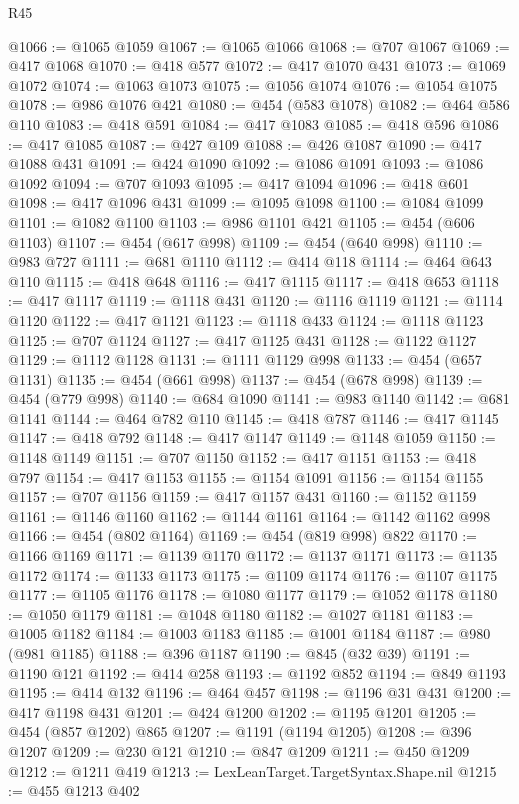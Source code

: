 \begin{lexlean}{R45}
\begin{coremodule}
{{{{{{{{{{{{{{{{{{{{{{{{{{{{{{{{{{{{{{{{{{{{{{{{{{{{{{{{{{{{{{{{{{{{{{{{{{{{{{{{{{{{{{{{{{{@1066 := @1065 @1059
@1067 := @1065 @1066
@1068 := @707 @1067
@1069 := @417 @1068
@1070 := @418 @577
@1072 := @417 @1070 @431
@1073 := @1069 @1072
@1074 := @1063 @1073
@1075 := @1056 @1074
@1076 := @1054 @1075
@1078 := @986 @1076 @421
@1080 := @454 (@583 @1078)
@1082 := @464 @586 @110
@1083 := @418 @591
@1084 := @417 @1083
@1085 := @418 @596
@1086 := @417 @1085
@1087 := @427 @109
@1088 := @426 @1087
@1090 := @417 @1088 @431
@1091 := @424 @1090
@1092 := @1086 @1091
@1093 := @1086 @1092
@1094 := @707 @1093
@1095 := @417 @1094
@1096 := @418 @601
@1098 := @417 @1096 @431
@1099 := @1095 @1098
@1100 := @1084 @1099
@1101 := @1082 @1100
@1103 := @986 @1101 @421
@1105 := @454 (@606 @1103)
@1107 := @454 (@617 @998)
@1109 := @454 (@640 @998)
@1110 := @983 @727
@1111 := @681 @1110
@1112 := @414 @118
@1114 := @464 @643 @110
@1115 := @418 @648
@1116 := @417 @1115
@1117 := @418 @653
@1118 := @417 @1117
@1119 := @1118 @431
@1120 := @1116 @1119
@1121 := @1114 @1120
@1122 := @417 @1121
@1123 := @1118 @433
@1124 := @1118 @1123
@1125 := @707 @1124
@1127 := @417 @1125 @431
@1128 := @1122 @1127
@1129 := @1112 @1128
@1131 := @1111 @1129 @998
@1133 := @454 (@657 @1131)
@1135 := @454 (@661 @998)
@1137 := @454 (@678 @998)
@1139 := @454 (@779 @998)
@1140 := @684 @1090
@1141 := @983 @1140
@1142 := @681 @1141
@1144 := @464 @782 @110
@1145 := @418 @787
@1146 := @417 @1145
@1147 := @418 @792
@1148 := @417 @1147
@1149 := @1148 @1059
@1150 := @1148 @1149
@1151 := @707 @1150
@1152 := @417 @1151
@1153 := @418 @797
@1154 := @417 @1153
@1155 := @1154 @1091
@1156 := @1154 @1155
@1157 := @707 @1156
@1159 := @417 @1157 @431
@1160 := @1152 @1159
@1161 := @1146 @1160
@1162 := @1144 @1161
@1164 := @1142 @1162 @998
@1166 := @454 (@802 @1164)
@1169 := @454 (@819 @998) @822
@1170 := @1166 @1169
@1171 := @1139 @1170
@1172 := @1137 @1171
@1173 := @1135 @1172
@1174 := @1133 @1173
@1175 := @1109 @1174
@1176 := @1107 @1175
@1177 := @1105 @1176
@1178 := @1080 @1177
@1179 := @1052 @1178
@1180 := @1050 @1179
@1181 := @1048 @1180
@1182 := @1027 @1181
@1183 := @1005 @1182
@1184 := @1003 @1183
@1185 := @1001 @1184
@1187 := @980 (@981 @1185)
@1188 := @396 @1187
@1190 := @845 (@32 @39)
@1191 := @1190 @121
@1192 := @414 @258
@1193 := @1192 @852
@1194 := @849 @1193
@1195 := @414 @132
@1196 := @464 @457
@1198 := @1196 @31 @431
@1200 := @417 @1198 @431
@1201 := @424 @1200
@1202 := @1195 @1201
@1205 := @454 (@857 @1202) @865
@1207 := @1191 (@1194 @1205)
@1208 := @396 @1207
@1209 := @230 @121
@1210 := @847 @1209
@1211 := @450 @1209
@1212 := @1211 @419
@1213 := LexLeanTarget.TargetSyntax.Shape.nil
@1215 := @455 @1213 @402
}}}}}}}}}}}}}}}}}}}}}}}}}}}}}}}}}}}}}}}}}}}}}}}}}}}}}}}}}}}}}}}}}}}}}}}}}}}}}}}}}}}}}}}}}}}
\end{coremodule}
\end{lexlean}
